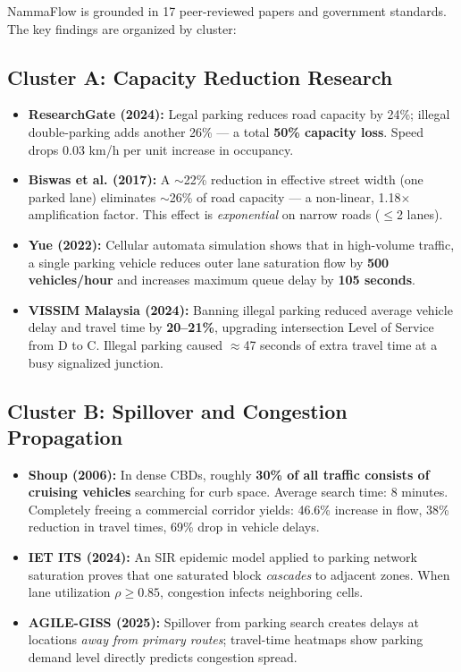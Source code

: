 \documentclass[12pt,a4paper]{article}
\begin{document}
NammaFlow is grounded in 17 peer-reviewed papers and government standards. The key findings are organized by cluster:

\subsection{Cluster A: Capacity Reduction Research}

\begin{itemize}[leftmargin=1.5em]
    \item \textbf{ResearchGate (2024):} Legal parking reduces road capacity by 24\%; illegal double-parking adds another 26\% — a total \textbf{50\% capacity loss}. Speed drops 0.03 km/h per unit increase in occupancy.
    
    \item \textbf{Biswas et al. (2017):} A $\sim$22\% reduction in effective street width (one parked lane) eliminates $\sim$26\% of road capacity — a non-linear, 1.18$\times$ amplification factor. This effect is \textit{exponential} on narrow roads ($\leq$2 lanes).
    
    \item \textbf{Yue (2022):} Cellular automata simulation shows that in high-volume traffic, a single parking vehicle reduces outer lane saturation flow by \textbf{500 vehicles/hour} and increases maximum queue delay by \textbf{105 seconds}.
    
    \item \textbf{VISSIM Malaysia (2024):} Banning illegal parking reduced average vehicle delay and travel time by \textbf{20--21\%}, upgrading intersection Level of Service from D to C. Illegal parking caused $\approx$47 seconds of extra travel time at a busy signalized junction.
\end{itemize}

\subsection{Cluster B: Spillover and Congestion Propagation}

\begin{itemize}[leftmargin=1.5em]
    \item \textbf{Shoup (2006):} In dense CBDs, roughly \textbf{30\% of all traffic consists of cruising vehicles} searching for curb space. Average search time: 8 minutes. Completely freeing a commercial corridor yields: 46.6\% increase in flow, 38\% reduction in travel times, 69\% drop in vehicle delays.
    
    \item \textbf{IET ITS (2024):} An SIR epidemic model applied to parking network saturation proves that one saturated block \textit{cascades} to adjacent zones. When lane utilization $\rho \geq 0.85$, congestion infects neighboring cells.
    
    \item \textbf{AGILE-GISS (2025):} Spillover from parking search creates delays at locations \textit{away from primary routes}; travel-time heatmaps show parking demand level directly predicts congestion spread.
\end{itemize}
\end{document}
